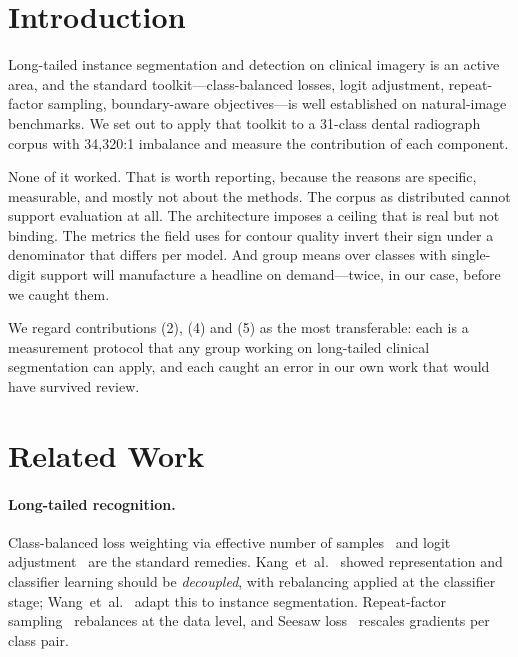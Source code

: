 \documentclass[10pt,twocolumn,letterpaper]{article}
\begin{document}
\begin{abstract}
A closed-form oracle fit attributes 85\,\% of the mask deficit to coefficient
prediction rather than to the learned basis. Acting on that attribution fails in
both available directions---capacity leaves masks unchanged, and direct
coefficient supervision makes them worse---so the deficit is correctly localised
and not thereby actionable. Finally, a fifteen-model consensus bounds the corpus
itself: 911 pathology annotations, 26--43\,\% of the floor classes, are
invisible to every model trained here, and the model that lifted caries by
35\,\% recovers 2.7\,\% of them. The remaining ceiling is the labels, and
the audit list is generated rather than hypothesised.
\end{abstract}

\section{Introduction}

Long-tailed instance segmentation and detection on clinical imagery is an active
area, and the standard toolkit---class-balanced losses, logit adjustment,
repeat-factor sampling, boundary-aware objectives---is well established on
natural-image benchmarks. We set out to apply that toolkit to a 31-class dental
radiograph corpus with 34{,}320:1 imbalance and measure the contribution of each
component.

None of it worked. That is worth reporting, because the reasons are specific,
measurable, and mostly not about the methods. The corpus as distributed cannot
support evaluation at all. The architecture imposes a ceiling that is real but
not binding. The metrics the field uses for contour quality invert their sign
under a denominator that differs per model. And group means over classes with
single-digit support will manufacture a headline on demand---twice, in our case,
before we caught them.

We regard contributions (2), (4) and (5) as the most transferable: each is a
measurement protocol that any group working on long-tailed clinical
segmentation can apply, and each caught an error in our own work that would have
survived review.

\section{Related Work}

\paragraph{Long-tailed recognition.}
Class-balanced loss weighting via effective number of samples~\cite{cui2019classbalanced}
and logit adjustment~\cite{menon2021logit} are the standard remedies.
Kang~et~al.~\cite{kang2020decoupling} showed representation and classifier
learning should be \emph{decoupled}, with rebalancing applied at the classifier
stage; Wang~et~al.~\cite{wang2019calibration} adapt this to instance
segmentation. Repeat-factor sampling~\cite{gupta2019lvis} rebalances at the data
level, and Seesaw loss~\cite{wang2021seesaw} rescales gradients per class pair.
\end{document}
